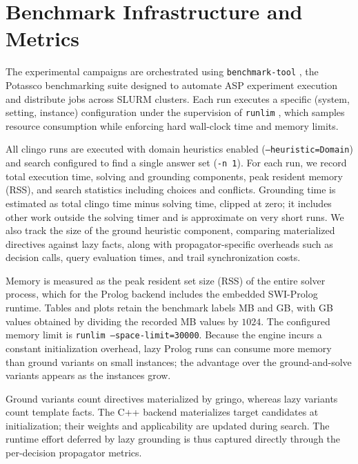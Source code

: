 \section{Benchmark Infrastructure and Metrics}
\label{sec:infra-metrics}

The experimental campaigns are orchestrated using \texttt{benchmark-tool} \cite{benchmarkTool}, the Potassco benchmarking suite designed to automate ASP experiment execution and distribute jobs across SLURM clusters. Each run executes a specific (system, setting, instance) configuration under the supervision of \texttt{runlim} \cite{runlim}, which samples resource consumption while enforcing hard wall-clock time and memory limits.

All clingo runs are executed with domain heuristics enabled (\texttt{--heuristic=\allowbreak Domain}) and search configured to find a single answer set (\texttt{-n 1}). For each run, we record total execution time, solving and grounding components, peak resident memory (RSS), and search statistics including choices and conflicts. Grounding time is estimated as total clingo time minus solving time, clipped at zero; it includes other work outside the solving timer and is approximate on very short runs. We also track the size of the ground heuristic component, comparing materialized directives against lazy facts, along with propagator-specific overheads such as decision calls, query evaluation times, and trail synchronization costs.

Memory is measured as the peak resident set size (RSS) of the entire solver process, which for the Prolog backend includes the embedded SWI-Prolog runtime. Tables and plots retain the benchmark labels MB and GB, with GB values obtained by dividing the recorded MB values by $1024$. The configured memory limit is \texttt{runlim --space-limit=30000}. Because the engine incurs a constant initialization overhead, lazy Prolog runs can consume more memory than ground variants on small instances; the advantage over the ground-and-solve variants appears as the instances grow.

Ground variants count directives materialized by gringo, whereas lazy variants count template facts. The C++ backend materializes target candidates at initialization; their weights and applicability are updated during search. The runtime effort deferred by lazy grounding is thus captured directly through the per-decision propagator metrics.
